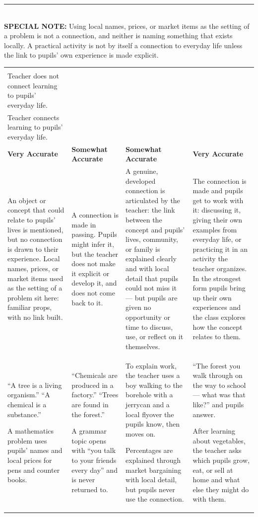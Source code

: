 \documentclass[10pt,a4paper]{article}
\makeatletter
\renewcommand{\arraystretch}{1.25}
\newcommand{\specialnote}[1]{%
  \noindent\textcolor{trule}{\rule{\linewidth}{0.4pt}}\\[1.2mm]
  {\footnotesize\textbf{SPECIAL NOTE:} #1}\\[2mm]}
\newlength{\gridw}\newlength{\stemw}\newlength{\stemh}\newlength{\stemtop}
\newcommand{\stemrow}[2]{%
  \setlength{\stemtop}{1.15\ht\strutbox}%
  \setlength{\stemw}{0.5\dimexpr\gridw-2\arrayrulewidth\relax}%
  \sbox{\stemAbox}{\begin{minipage}[t]{\dimexpr\stemw-4.4mm\relax}\RaggedRight
      \footnotesize\textbf{Column A}\\#1\end{minipage}}%
  \sbox{\stemBbox}{\begin{minipage}[t]{\dimexpr\stemw-4.4mm\relax}\RaggedRight
      \footnotesize\textbf{Column B}\\#2\end{minipage}}%
  \setlength{\stemh}{\dimexpr\ht\stemAbox+\dp\stemAbox\relax}%
  \ifdim\dimexpr\ht\stemBbox+\dp\stemBbox\relax>\stemh
    \setlength{\stemh}{\dimexpr\ht\stemBbox+\dp\stemBbox\relax}\fi
  \setlength{\stemh}{\dimexpr\stemtop+\stemh+2.6mm\relax}%
  \begin{tikzpicture}[inner sep=0pt,outer sep=0pt,baseline=0pt]
    \shade[left color=gradA,middle color=gradM,right color=gradB]
      (0,\stemtop) rectangle (\dimexpr\gridw-2\arrayrulewidth\relax,
                              \dimexpr\stemtop-\stemh\relax);
    \draw[black,line width=\arrayrulewidth]
      (\stemw,\stemtop) -- (\stemw,\dimexpr\stemtop-\stemh\relax);
    \node[anchor=north west] at (2.2mm,\dimexpr\stemtop-1.2mm\relax)
      {\usebox{\stemAbox}};
    \node[anchor=north west] at (\dimexpr\stemw+2.2mm\relax,
                                 \dimexpr\stemtop-1.2mm\relax)
      {\usebox{\stemBbox}};
  \end{tikzpicture}}
\newcommand{\scoregrid}[4]{%
  \setlength{\gridw}{\linewidth}%
  \renewcommand{\arraystretch}{1.06}%
  \noindent\footnotesize
  \begin{tabularx}{\linewidth}{|>{\RaggedRight\arraybackslash}X
                               |>{\RaggedRight\arraybackslash}X
                               |>{\RaggedRight\arraybackslash}X
                               |>{\RaggedRight\arraybackslash}X|}
  \hline
  \multicolumn{4}{|@{}l@{}|}{\stemrow{#1}{#2}}\\
  \hline
  \rowcolor{tsub}
  \centering\arraybackslash\textbf{Very Accurate} &
  \centering\arraybackslash\textbf{Somewhat Accurate} &
  \centering\arraybackslash\textbf{Somewhat Accurate} &
  \centering\arraybackslash\textbf{Very Accurate}\\
  \hline
  #3\\
  \hline
  \rowcolor{texfill} #4\\
  \hline
  \end{tabularx}\normalsize}
\makeatother
\begin{document}
\specialnote{Using local names, prices, or market items as the setting of a problem is not a connection, and neither is naming something that exists locally. A practical activity is not by itself a connection to everyday life unless the link to pupils' own experience is made explicit.}
\scoregrid{Teacher does not connect learning to pupils' everyday life.}{Teacher connects learning to pupils' everyday life.}{%
\scriptsize An object or concept that could relate to pupils' lives is mentioned, but no connection is drawn to their experience. Local names, prices, or market items used as the setting of a problem sit here: familiar props, with no link built. &
\scriptsize A connection is made in passing. Pupils might infer it, but the teacher does not make it explicit or develop it, and does not come back to it. &
\scriptsize A genuine, developed connection is articulated by the teacher: the link between the concept and pupils' lives, community, or family is explained clearly and with local detail that pupils could not miss it --- but pupils are given no opportunity or time to discuss, use, or reflect on it themselves. &
\scriptsize The connection is made and pupils get to work with it: discussing it, giving their own examples from everyday life, or practicing it in an activity the teacher organizes. In the strongest form pupils bring up their own experiences and the class explores how the concept relates to them.
}{%
\begin{exlist}
\item ``A tree is a living organism.'' ``A chemical is a substance.''
\item A mathematics problem uses pupils' names and local prices for pens and counter books.
\end{exlist} &
\begin{exlist}
\item ``Chemicals are produced in a factory.'' ``Trees are found in the forest.''
\item A grammar topic opens with ``you talk to your friends every day'' and is never returned to.
\end{exlist} &
\begin{exlist}
\item To explain work, the teacher uses a boy walking to the borehole with a jerrycan and a local flyover the pupils know, then moves on.
\item Percentages are explained through market bargaining with local detail, but pupils never use the connection.
\end{exlist} &
\begin{exlist}
\item ``The forest you walk through on the way to school --- what was that like?'' and pupils answer.
\item After learning about vegetables, the teacher asks which pupils grow, eat, or sell at home and what else they might do with them.
\end{exlist}
}
\clearpage
\end{document}
